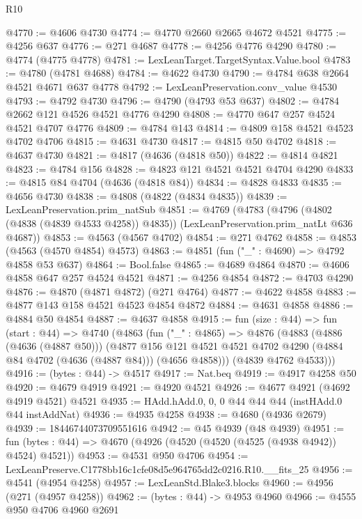 \begin{lexlean}{R10}
\begin{coremodule}
@4770 := @4606 @4730
@4774 := @4770 @2660 @2665 @4672 @4521
@4775 := @4256 @637
@4776 := @271 @4687
@4778 := @4256 @4776 @4290
@4780 := @4774 (@4775 @4778)
@4781 := LexLeanTarget.TargetSyntax.Value.bool
@4783 := @4780 (@4781 @4688)
@4784 := @4622 @4730
@4790 := @4784 @638 @2664 @4521 @4671 @637 @4778
@4792 := LexLeanPreservation.conv_value @4530
@4793 := @4792 @4730
@4796 := @4790 (@4793 @53 @637)
@4802 := @4784 @2662 @121 @4526 @4521 @4776 @4290
@4808 := @4770 @647 @257 @4524 @4521 @4707 @4776
@4809 := @4784 @143
@4814 := @4809 @158 @4521 @4523 @4702 @4706
@4815 := @4631 @4730
@4817 := @4815 @50 @4702
@4818 := @4637 @4730
@4821 := @4817 (@4636 (@4818 @50))
@4822 := @4814 @4821
@4823 := @4784 @156
@4828 := @4823 @121 @4521 @4521 @4704 @4290
@4833 := @4815 @84 @4704 (@4636 (@4818 @84))
@4834 := @4828 @4833
@4835 := @4656 @4730
@4838 := @4808 (@4822 (@4834 @4835))
@4839 := LexLeanPreservation.prim_natSub
@4851 := @4769
    (@4783
      (@4796 (@4802 (@4838 (@4839 @4533 @4258)) @4835))
      (LexLeanPreservation.prim_natLt @636 @4687))
@4853 := @4563 (@4567 @4702)
@4854 := @271 @4762
@4858 := @4853 (@4563 (@4570 @4854) @4573)
@4863 := @4851 (fun ("_" : @4690) => @4792 @4858 @53 @637)
@4864 := Bool.false
@4865 := @4689 @4864
@4870 := @4606 @4858 @647 @257 @4524 @4521
@4871 := @4256 @4854
@4872 := @4703 @4290
@4876 := @4870 (@4871 @4872) (@271 @4764)
@4877 := @4622 @4858
@4883 := @4877 @143 @158 @4521 @4523 @4854 @4872
@4884 := @4631 @4858
@4886 := @4884 @50 @4854
@4887 := @4637 @4858
@4915 := fun (size : @44) =>
  fun (start : @44) =>
  @4740
    (@4863
      (fun ("_" : @4865) =>
      @4876
        (@4883
          (@4886 (@4636 (@4887 @50)))
          (@4877
            @156
            @121
            @4521
            @4521
            @4702
            @4290
            (@4884 @84 @4702 (@4636 (@4887 @84)))
            (@4656 @4858)))
        (@4839 @4762 @4533)))
@4916 := (bytes : @44) -> @4517
@4917 := Nat.beq
@4919 := @4917 @4258 @50
@4920 := @4679 @4919
@4921 := @4920 @4521
@4926 := @4677 @4921 (@4692 @4919 @4521) @4521
@4935 := HAdd.hAdd.{0, 0, 0} @44 @44 @44 (instHAdd.{0} @44 instAddNat)
@4936 := @4935 @4258
@4938 := @4680 (@4936 @2679)
@4939 := 18446744073709551616
@4942 := @45 @4939 (@48 @4939)
@4951 := fun (bytes : @44) => @4670 (@4926 (@4520 (@4520 (@4525 (@4938 @4942)) @4524) @4521))
@4953 := @4531 @950 @4706
@4954 := LexLeanPreserve.C1778bb16c1cfe08d5e964765dd2c0216.R10.__fits_25
@4956 := @4541 (@4954 @4258)
@4957 := LexLeanStd.Blake3.blocks
@4960 := @4956 (@271 (@4957 @4258))
@4962 := (bytes : @44) -> @4953 @4960
@4966 := @4555 @950 @4706 @4960 @2691

\end{coremodule}
\end{lexlean}
